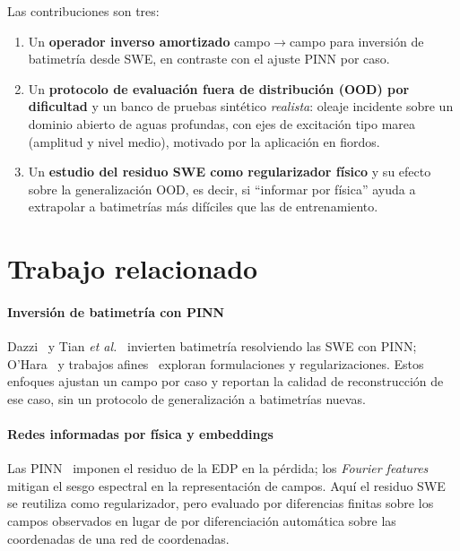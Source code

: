 \documentclass[conference]{IEEEtran}
\begin{document}
Las contribuciones son tres:
\begin{enumerate}
  \item Un \textbf{operador inverso amortizado} campo$\to$campo para inversión
        de batimetría desde SWE, en contraste con el ajuste PINN por caso.
  \item Un \textbf{protocolo de evaluación fuera de distribución (OOD) por
        dificultad} y un banco de pruebas sintético \emph{realista}: oleaje
        incidente sobre un dominio abierto de aguas profundas, con ejes de
        excitación tipo marea (amplitud y nivel medio), motivado por la
        aplicación en fiordos.
  \item Un \textbf{estudio del residuo SWE como regularizador físico} y su
        efecto sobre la generalización OOD, es decir, si ``informar por física''
        ayuda a extrapolar a batimetrías más difíciles que las de entrenamiento.
\end{enumerate}

\section{Trabajo relacionado}
\label{sec:related}

\paragraph*{Inversión de batimetría con PINN}
Dazzi~\cite{dazzi2024} y Tian \emph{et al.}~\cite{tian2025} invierten batimetría
resolviendo las SWE con PINN; O'Hara~\cite{ohara2024} y trabajos
afines~\cite{chen2023,liu2024} exploran formulaciones y regularizaciones. Estos
enfoques ajustan un campo por caso y reportan la calidad de reconstrucción de
ese caso, sin un protocolo de generalización a batimetrías nuevas.

\paragraph*{Redes informadas por física y embeddings}
Las PINN~\cite{raissi2019} imponen el residuo de la EDP en la pérdida; los
\emph{Fourier features}~\cite{tancik2020} mitigan el sesgo espectral en la
representación de campos. Aquí el residuo SWE se reutiliza como regularizador,
pero evaluado por diferencias finitas sobre los campos observados en lugar de
por diferenciación automática sobre las coordenadas de una red de coordenadas.
\end{document}
